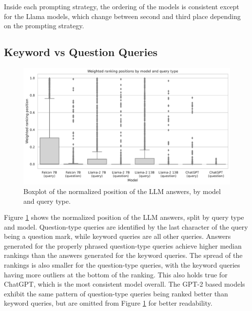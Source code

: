 Inside each prompting strategy, the ordering of the models is consistent except for the Llama models, which change between second and third place depending on the prompting strategy.

\subsection{Keyword vs Question Queries}
\begin{figure}
    \centering
    \includegraphics[width=\textwidth]{images/weighted_position_boxplot_by_model_and_question.pdf}
    \caption{Boxplot of the normalized position of the LLM answers, by model and query type.}
    \label{fig:weighted_position_boxplot_by_model_and_question}
\end{figure}
Figure \ref{fig:weighted_position_boxplot_by_model_and_question} shows the normalized position of the LLM answers, split by query type and model.
Question-type queries are identified by the last character of the query being a question mark, while keyword queries are all other queries.
Answers generated for the properly phrased question-type queries achieve higher median rankings than the answers generated for the keyword queries.
The spread of the rankings is also smaller for the question-type queries, with the keyword queries having more outliers at the bottom of the ranking.
This also holds true for ChatGPT, which is the most consistent model overall.
The GPT-2 based models exhibit the same pattern of question-type queries being ranked better than keyword queries, but are omitted from Figure \ref{fig:weighted_position_boxplot_by_model_and_question} for better readability.

